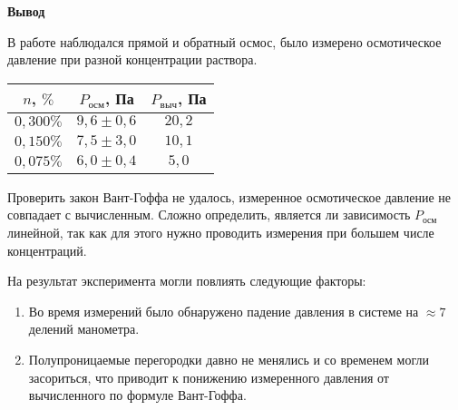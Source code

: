 \textbf{\Large Вывод}

В работе наблюдался прямой и обратный осмос, было измерено осмотическое давление при разной концентрации раствора.

\begin{tabular}{|c|c|c|}
	\hline
	$n$, $\%$ & $P_{осм}$, Па & $P_{выч}$, Па \\
	\hline
	$0,300 \%$ & $9,6 \pm 0,6$  & $20,2$ \\
	$0,150 \%$ & $7,5 \pm 3,0$  & $10,1$ \\
 	$0,075 \%$ & $6,0 \pm 0,4$  & $5,0$  \\
	\hline
\end{tabular}

Проверить закон Вант-Гоффа не удалось, измеренное осмотическое давление не совпадает с вычисленным. Сложно определить, является ли зависимость $P_{осм}$ линейной, так как для этого нужно проводить измерения при большем числе концентраций.

На результат эксперимента могли повлиять следующие факторы:

\begin{enumerate}
	\item Во время измерений было обнаружено падение давления в системе на $\approx 7$ делений манометра.
	\item Полупроницаемые перегородки давно не менялись и со временем могли засориться, что приводит к понижению измеренного давления от вычисленного по формуле Вант-Гоффа. 
\end{enumerate}